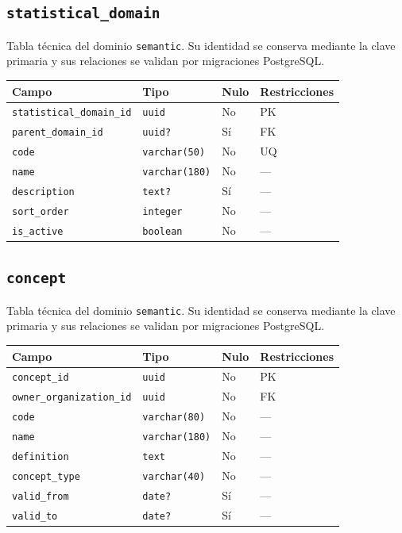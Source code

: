 \documentclass[11pt]{article}
\begin{document}
\subsection{\texttt{statistical\_domain}}
Tabla técnica del dominio \texttt{semantic}. Su identidad se conserva mediante la clave primaria y sus relaciones se validan por migraciones PostgreSQL.
\begin{longtable}{>{\raggedright\arraybackslash}p{} p{} p{} p{}}
\toprule Campo & Tipo & Nulo & Restricciones \\ \midrule\endhead
\texttt{statistical\_domain\_id} & \texttt{uuid} & No & PK \\
\texttt{parent\_domain\_id} & \texttt{uuid?} & Sí & FK \\
\texttt{code} & \texttt{varchar(50)} & No & UQ \\
\texttt{name} & \texttt{varchar(180)} & No & --- \\
\texttt{description} & \texttt{text?} & Sí & --- \\
\texttt{sort\_order} & \texttt{integer} & No & --- \\
\texttt{is\_active} & \texttt{boolean} & No & --- \\
\bottomrule\end{longtable}
\subsection{\texttt{concept}}
Tabla técnica del dominio \texttt{semantic}. Su identidad se conserva mediante la clave primaria y sus relaciones se validan por migraciones PostgreSQL.
\begin{longtable}{>{\raggedright\arraybackslash}p{} p{} p{} p{}}
\toprule Campo & Tipo & Nulo & Restricciones \\ \midrule\endhead
\texttt{concept\_id} & \texttt{uuid} & No & PK \\
\texttt{owner\_organization\_id} & \texttt{uuid} & No & FK \\
\texttt{code} & \texttt{varchar(80)} & No & --- \\
\texttt{name} & \texttt{varchar(180)} & No & --- \\
\texttt{definition} & \texttt{text} & No & --- \\
\texttt{concept\_type} & \texttt{varchar(40)} & No & --- \\
\texttt{valid\_from} & \texttt{date?} & Sí & --- \\
\texttt{valid\_to} & \texttt{date?} & Sí & --- \\
\bottomrule\end{longtable}
\end{document}
